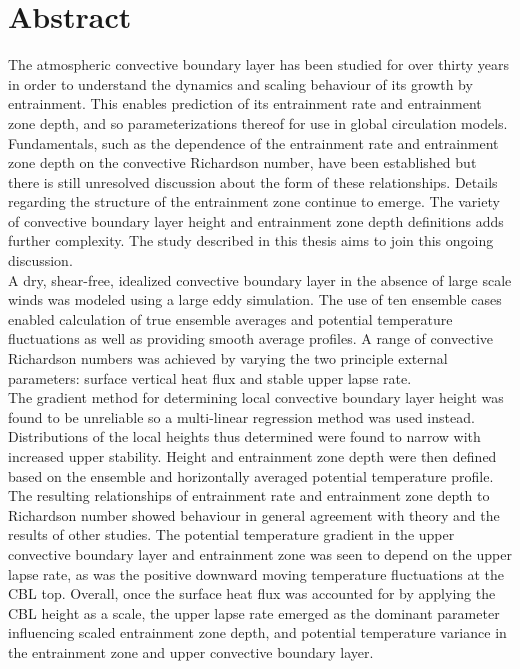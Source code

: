
\chapter{Abstract}
\setlength{\parindent}{0cm}
The atmospheric convective boundary layer has been studied for over thirty years in order to understand the dynamics and scaling behaviour of its growth by entrainment.  This enables prediction of its entrainment rate and entrainment zone depth, and so parameterizations thereof for use in global circulation models.\\

Fundamentals, such as the dependence of the entrainment rate and entrainment zone depth on the convective Richardson number, have been established but there is still unresolved discussion about the form of these relationships.  Details regarding the structure of the entrainment zone continue to emerge.  The variety of convective boundary layer height and entrainment zone depth definitions adds further complexity.  The study described in this thesis aims to join this ongoing discussion.\\

A dry, shear-free, idealized convective boundary layer in the absence of large scale winds was modeled using a large eddy simulation.  The use of ten ensemble cases enabled calculation of true ensemble averages and potential temperature fluctuations as well as providing smooth average profiles.  A range of convective Richardson numbers was achieved by varying the two principle external parameters: surface vertical heat flux and stable upper lapse rate.\\

The gradient method for determining local convective boundary layer height was found to be unreliable so a multi-linear regression method was used instead.  Distributions of the local heights thus determined were found to narrow with increased upper stability.  Height and entrainment zone depth were then defined based on the ensemble and horizontally averaged potential temperature profile.  The resulting relationships of entrainment rate and entrainment zone depth to Richardson number showed behaviour in general agreement with theory and the results of other studies.  The potential temperature gradient in the upper convective boundary layer and entrainment zone was seen to depend on the upper lapse rate, as was the positive downward moving temperature fluctuations at the \acs{CBL} top.  Overall, once the surface heat flux was accounted for by applying the \acs{CBL} height as a scale, the upper lapse rate emerged as the dominant parameter influencing scaled entrainment zone depth, and potential temperature variance in the entrainment zone and upper convective boundary layer.   

